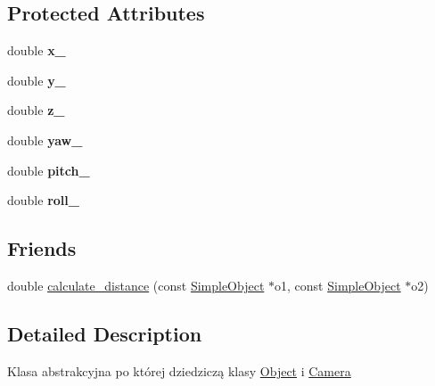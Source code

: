 \subsection*{Protected Attributes}
\begin{DoxyCompactItemize}
\item 
double {\bfseries x\+\_\+}\hypertarget{class_simple_object_a5ef9c7a8f7fb8ac661bff5dcb33983a7}{}\label{class_simple_object_a5ef9c7a8f7fb8ac661bff5dcb33983a7}

\item 
double {\bfseries y\+\_\+}\hypertarget{class_simple_object_ac80d26a13b1c0bd55403a947745b5f03}{}\label{class_simple_object_ac80d26a13b1c0bd55403a947745b5f03}

\item 
double {\bfseries z\+\_\+}\hypertarget{class_simple_object_a7adae5ef28bc1101e6a0341f1b97f4cd}{}\label{class_simple_object_a7adae5ef28bc1101e6a0341f1b97f4cd}

\item 
double {\bfseries yaw\+\_\+}\hypertarget{class_simple_object_a2223327221cd21410ac4d60fa1ad479a}{}\label{class_simple_object_a2223327221cd21410ac4d60fa1ad479a}

\item 
double {\bfseries pitch\+\_\+}\hypertarget{class_simple_object_aa4966ef233fe74cc77c0a75e97729221}{}\label{class_simple_object_aa4966ef233fe74cc77c0a75e97729221}

\item 
double {\bfseries roll\+\_\+}\hypertarget{class_simple_object_ae253b25a26259913b424129021885911}{}\label{class_simple_object_ae253b25a26259913b424129021885911}

\end{DoxyCompactItemize}
\subsection*{Friends}
\begin{DoxyCompactItemize}
\item 
double \hyperlink{class_simple_object_adbeedfd57e99d5aeab512c85ee1b6849}{calculate\+\_\+distance} (const \hyperlink{class_simple_object}{Simple\+Object} $\ast$o1, const \hyperlink{class_simple_object}{Simple\+Object} $\ast$o2)
\end{DoxyCompactItemize}


\subsection{Detailed Description}
Klasa abstrakcyjna po której dziedziczą klasy \hyperlink{class_object}{Object} i \hyperlink{class_camera}{Camera} 

